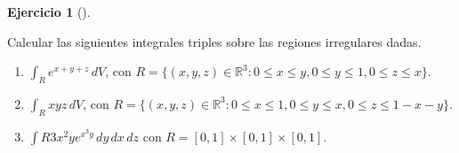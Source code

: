 \documentclass[
  spanish,
  a4paper,
]{scrreport}
\theoremstyle{definition}
\newtheorem{exercise}{Ejercicio}[chapter]
\theoremstyle{remark}
\begin{document}
\begin{exercise}[]\protect\hypertarget{exr-integrales-triples-regiones-irregulares}{}\label{exr-integrales-triples-regiones-irregulares}

Calcular las siguientes integrales triples sobre las regiones
irregulares dadas.

\begin{enumerate}
\def\labelenumi{\alph{enumi}.}
\item
  \(\int_R e^{x+y+z}\,dV\), con
  \(R=\{(x,y,z)\in\mathbb{R}^3: 0\leq x\leq y, 0\leq y\leq 1, 0\leq z\leq x\}\).
\item
  \(\int_R xyz\,dV\), con
  \(R=\{(x,y,z)\in\mathbb{R}^3: 0\leq x\leq 1, 0\leq y\leq x, 0\leq z\leq 1-x-y\}\).
\item
  \(\int R 3x^2ye^{x^3 y}\,dy\,dx\,dz\) con
  \(R=[0,1]\times [0, 1]\times [0, 1]\).
\end{enumerate}

\end{exercise}
\end{document}
